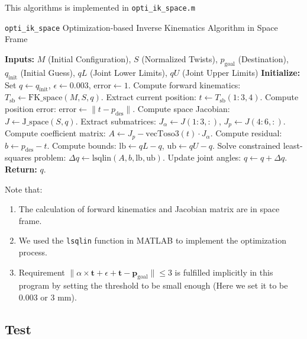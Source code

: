 \documentclass[english,10pt,a4paper]{book}
\begin{document}
		This algorithms is implemented in \texttt{opti\_ik\_space.m}
		\begin{algorithm}[H]
			\caption{\texttt{opti\_ik\_space} Optimization-based Inverse Kinematics Algorithm in Space Frame}
			\begin{algorithmic}[1]
				\State \textbf{Inputs:} $M$ (Initial Configuration), $S$ (Normalized Twists), $p_{\text{goal}}$ (Destination), $q_{\text{init}}$ (Initial Guess), $qL$ (Joint Lower Limits), $qU$ (Joint Upper Limits)
				\State \textbf{Initialize:} Set $q \gets q_{\text{init}}$, $\epsilon \gets 0.003$, $\text{error} \gets 1$.
				\State Compute forward kinematics: $T_{\text{sb}} \gets \text{FK\_space}(M, S, q)$.
				\State Extract current position: $t \gets T_{\text{sb}}(1:3, 4)$.
				\State Compute position error: $\text{error} \gets \| t - p_{\text{des}} \|$.
				\State Compute space Jacobian: $J \gets \text{J\_space}(S, q)$.
				\State Extract submatrices: $J_{\alpha} \gets J(1:3, :)$, $J_p \gets J(4:6, :)$.
				\State Compute coefficient matrix: $A \gets J_p - \text{vecToso3}(t) \cdot J_{\alpha}$.
				\State Compute residual: $b \gets p_{\text{des}} - t$.
				\State Compute bounds: $\text{lb} \gets qL - q$, $\text{ub} \gets qU - q$.
				\State Solve constrained least-squares problem: $\Delta q \gets \text{lsqlin}(A, b, \text{lb}, \text{ub})$.
				\State Update joint angles: $q \gets q + \Delta q$.
				\EndWhile
				\State \textbf{Return:} $q$.
			\end{algorithmic}
		\end{algorithm}
		Note that: \begin{enumerate}
			\item The calculation of forward kinematics and Jacobian matrix are in space frame.
			\item We used the \texttt{lsqlin} function in MATLAB to implement the optimization process.
			\item Requirement \(\| \alpha \times \mathbf{t} + \epsilon + \mathbf{t} - \mathbf{p}_{\text{goal}} \| \leq 3\) is fulfilled implicitly in this program by setting the threshold to be small enough (Here we set it to be 0.003 or 3 mm).
		\end{enumerate}
		
		\subsection{Test}
\end{document}
